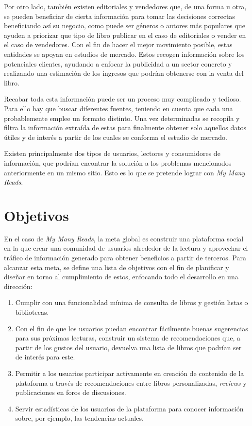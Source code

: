 Por otro lado, también existen editoriales y vendedores que, de una forma u otra, se pueden beneficiar de cierta información para tomar las decisiones correctas beneficiando así su negocio, como puede ser géneros o autores más populares que ayuden a priorizar que tipo de libro publicar en el caso de editoriales o vender en el caso de vendedores. Con el fin de hacer el mejor movimiento posible, estas entidades se apoyan en estudios de mercado. Estos recogen información sobre los potenciales clientes, ayudando a enfocar la publicidad a un sector concreto y realizando una estimación de los ingresos que podrían obtenerse con la venta del libro.

Recabar toda esta información puede ser un proceso muy complicado y tedioso. Para ello hay que buscar diferentes fuentes, teniendo en cuenta que cada una probablemente emplee un formato distinto. Una vez determinadas se  recopila y filtra la información extraída de estas para finalmente obtener solo aquellos datos útiles y de interés a partir de los cuales se conforma el estudio de mercado.

Existen principalmente dos tipos de usuarios, lectores y consumidores de información, que podrían encontrar la solución a los problemas mencionados anteriormente en un mismo sitio. Esto es lo que se pretende lograr con \textit{My Many Reads}.

\section{Objetivos}
En el caso de \textit{My Many Reads}, la meta global es construir una plataforma social en la que crear una comunidad de usuarios alrededor de la lectura y aprovechar el tráfico de información generado para obtener beneficios a partir de terceros. Para alcanzar esta meta, se define una lista de objetivos con el fin de planificar y diseñar en torno al cumplimiento de estos, enfocando todo el desarrollo en una dirección:

\begin{enumerate}[label=\textbf{O-\arabic*}]
    \item Cumplir con una funcionalidad mínima de consulta de libros y gestión listas o bibliotecas.
    \item Con el fin de que los usuarios puedan encontrar fácilmente buenas sugerencias para sus próximas lecturas, construir un sistema de recomendaciones que, a partir de los gustos del usuario, devuelva una lista de libros que podrían ser de interés para este.
    \item Permitir a los usuarios participar activamente en creación de contenido de la plataforma a través de recomendaciones entre libros personalizadas, \textit{reviews} y publicaciones en foros de discusiones.
    \item Servir estadísticas de los usuarios de la plataforma para conocer información sobre, por ejemplo, las tendencias actuales.
\end{enumerate}

